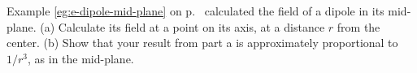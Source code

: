 Example \ref{eg:e-dipole-mid-plane} on p.~\pageref{eg:e-dipole-mid-plane} calculated the field
of a dipole in its mid-plane. (a) Calculate its field at a point on its axis, at a distance $r$
from the center. (b) Show that your result from part a is approximately proportional to
$1/r^3$, as in the mid-plane.

